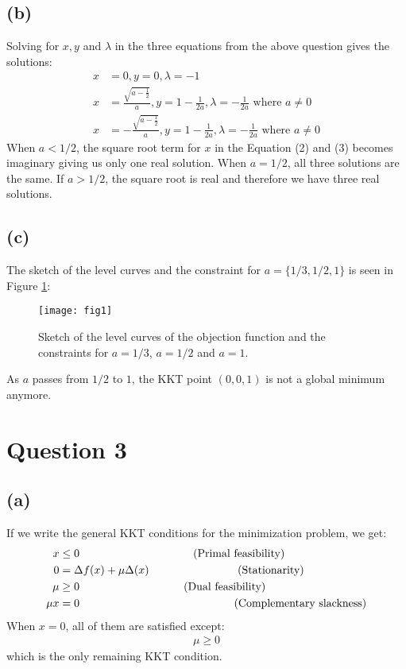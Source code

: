 \documentclass[a4paper, fleqn]{article}
\newcommand{\comment}[1]{%
  \text{\phantom{(#1)}} \tag{#1}}
\begin{document}
\subsection*{(b)}
Solving for $x,y$ and $\lambda$ in the three equations from the above question gives the solutions:
\begin{align*}
  x &= 0, y= 0, \lambda = -1 \\
  x &=\frac{\sqrt{a-\frac{1}{2}}}{a}, y=1-\frac{1}{2a}, \lambda= -\frac{1}{2a} \mbox{ where }
  a\neq 0 \\
  x &=-\frac{\sqrt{a-\frac{1}{2}}}{a}, y=1-\frac{1}{2a}, \lambda= -\frac{1}{2a} \mbox{ where }
  a\neq 0
\end{align*}
When $a<1/2$, the square root term for $x$ in the Equation (2) and (3) becomes imaginary
giving us only one real solution. When $a=1/2$, all three solutions are the same. If
$a>1/2$, the square root is real and therefore we have three real solutions.

\subsection*{(c)}
The sketch of the level curves and the constraint for $a=\{1/3,1/2,1\}$ is seen in Figure
\ref{fig1}:
\begin{figure}[H]
  \centering
  \texttt{[image: fig1]}
  \caption{Sketch of the level curves of the objection function and the constraints for
  $a=1/3$, $a=1/2$ and $a=1$.}
  \label{fig1}
\end{figure}
As $a$ passes from $1/2$ to $1$, the KKT point $(0,0,1)$ is not a global minimum anymore.

\section*{Question 3}
\subsection*{(a)}
If we write the general KKT conditions for the minimization problem, we get:
\begin{align*}
  x &\leq 0 \comment{Primal feasibility} \\
  0 &= \Delta f(x) + \mu \Delta(x) \comment{Stationarity} \\
  \mu &\geq 0 \comment{Dual feasibility} \\
  \mu x &= 0 \comment{Complementary slackness}
\end{align*}
When $x=0$, all of them are satisfied except:
\begin{align*}
  \mu \geq 0
\end{align*}
which is the only remaining KKT condition.
\end{document}
